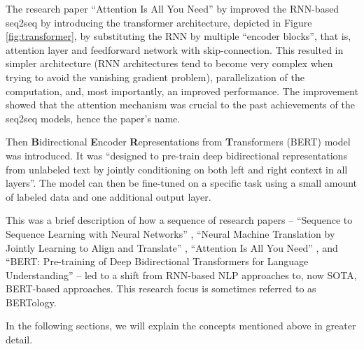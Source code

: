 The research paper ``Attention Is All You Need'' by \citet{attention-is-all-you-need} improved the RNN-based seq2seq by introducing the transformer architecture, depicted in Figure \ref{fig:transformer}, by substituting the RNN by multiple ``encoder blocks'', that is, attention layer and feedforward network with skip-connection. 
This resulted in simpler architecture (RNN architectures tend to become very complex when trying to avoid the vanishing gradient problem), parallelization of the computation, and, most importantly, an improved performance. 
The improvement showed that the attention mechanism was crucial to the past achievements of the seq2seq models, hence the paper's name.

Then \textbf{B}idirectional \textbf{E}ncoder \textbf{R}epresentations from \textbf{T}ransformers (BERT) \citep{bert} model was introduced. It was ``designed to pre-train deep bidirectional representations from unlabeled text by jointly conditioning on both left and right context in all layers''. 
The model can then be fine-tuned on a specific task using a small amount of labeled data and one additional output layer. 

This was a brief description of how a sequence of research papers -- ``Sequence to Sequence Learning with Neural Networks'' \citep{seq2seq}, ``Neural Machine Translation by Jointly Learning to Align and Translate'' \citep{first-attention}, ``Attention Is All You Need'' \citep{attention-is-all-you-need}, and ``BERT: Pre-training of Deep Bidirectional Transformers for Language Understanding'' \citep{bert} -- led to a shift from RNN-based NLP approaches to, now SOTA, BERT-based approaches.
This research focus is sometimes referred to as BERTology.

In the following sections, we will explain the concepts mentioned above in greater detail.

